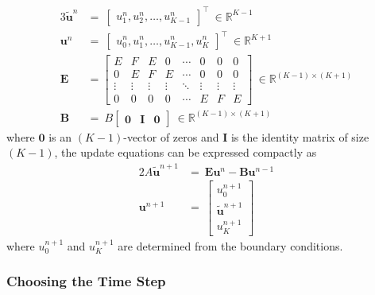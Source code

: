 \documentclass{article}
\begin{document}
\begin{alignat}{3}
   \tilde{\mathbf{u}}^{n} &=\
   \begin{bmatrix}
      u_{1}^{n}, u_{2}^{n}, \ldots, u_{K-1}^{n}
   \end{bmatrix}^{\intercal}\ \in \mathbb{R}^{K-1} \nonumber \\
   \mathbf{u}^{n} &=\
   \begin{bmatrix}
      u_{0}^{n}, u_{1}^{n}, \ldots, u_{K-1}^{n}, u_{K}^{n}
   \end{bmatrix}^{\intercal}\ \in \mathbb{R}^{K+1} \nonumber \\
   \label{eqn: E matrix}
   \mathbf{E} &=
   \begin{bmatrix}
      E & F & E & 0 & \cdots & 0 & 0 & 0 \\
      0 & E & F & E & \cdots & 0 & 0 & 0 \\
      \vdots & \vdots & \vdots & \vdots & \ddots & \vdots & \vdots & \vdots \\
      0 & 0 & 0 & 0 & \cdots & E & F & E
   \end{bmatrix}\ \in \mathbb{R}^{\left(K-1\right) \times \left(K+1\right)} \\
   \label{eqn: B matrix}
   \mathbf{B} &=\
   B
   \begin{bmatrix}
      \mathbf{0} & \mathbf{I} & \mathbf{0}
   \end{bmatrix}\ \in \mathbb{R}^{\left(K-1\right) \times \left(K+1\right)}
\end{alignat}
where $\mathbf{0}$ is an $\left(K-1\right)$-vector of zeros and
$\mathbf{I}$ is the identity matrix of size $\left(K-1\right)$,
the update equations can be expressed compactly as
\begin{alignat}{2}
   \label{eqn: Difference eqn vectorized Pt. 1}
   A \tilde{\mathbf{u}}^{n+1} &=\ \mathbf{E} \mathbf{u}^{n} - \mathbf{B} \mathbf{u}^{n-1} \\
   \label{eqn: Difference eqn vectorized Pt. 2}
   \mathbf{u}^{n+1} &=\ 
   \begin{bmatrix}
      u_{0}^{n+1} \\
      \tilde{\mathbf{u}}^{n+1} \\
      u_{K}^{n+1}
   \end{bmatrix}
\end{alignat}
where $u_{0}^{n+1}$ and $u_{K}^{n+1}$ are determined from the boundary conditions.

\subsubsection{Choosing the Time Step}
\label{subsubsec: Choosing the Time Step}
\end{document}
